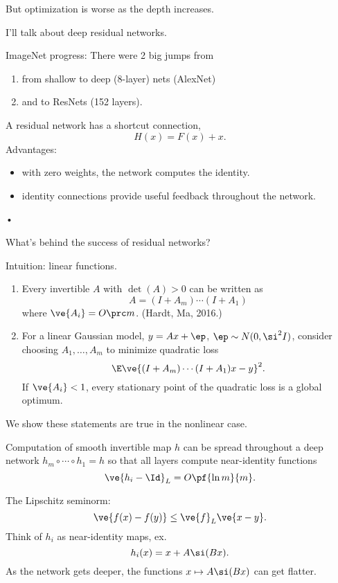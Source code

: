 But optimization is worse as the depth increases.

I'll talk about deep residual networks. 

ImageNet progress: There were 2 big jumps from 
\begin{enumerate}
\item
from shallow to deep (8-layer) nets (AlexNet)
\item
and to ResNets (152 layers).
\end{enumerate}
A residual network has a shortcut connection, 
$$
H(x) = F(x) + x.
$$
Advantages:
\begin{itemize}
\item
with zero weights, the network computes the identity.
\item
identity connections provide useful feedback throughout the network.
\end{itemize}•

What's behind the success of residual networks?

Intuition: linear functions. 
\begin{enumerate}
\item
Every invertible $A$ with $\det(A)>0$ can be written as
$$
A = (I+A_m)\cdots (I+A_1)
$$
where $\ve{A_i} = O\prc m$. (Hardt, Ma, 2016.)
\item
For a linear Gaussian model, $y=Ax+\ep$, $\ep\sim N(0,\si^2I)$, consider choosing $A_1,\ldots, A_m$ to minimize quadratic loss
$$
\E \ve{(I+A_m)\cdots (I+A_1) x - y}^2.
$$
If $\ve{A_i}<1$, every stationary point of the quadratic loss is a global optimum. 
\end{enumerate}
We show these statements are true in the nonlinear case.
\begin{thm*}
Computation of smooth invertible map $h$ can be spread throughout a deep network $h_m\circ \cdots \circ h_1=h$ so that all layers compute near-identity functions
$$
\ve{h_i-\Id}_L = O\pf{\ln m}{m}.
$$
\end{thm*}
The Lipschitz seminorm:
$$\ve{f(x)-f(y)}\le \ve{f}_L \ve{x-y}.$$
Think of $h_i$ as near-identity maps, ex.
$$
h_i(x) = x + A\si(Bx).
$$
As the network gets deeper, the functions $x\mapsto A\si(Bx)$ can get flatter.


